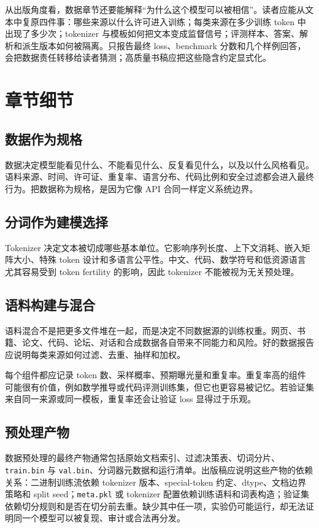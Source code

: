 \documentclass[UTF8,zihao=-4,openany]{ctexbook}
\begin{document}
从出版角度看，数据章节还要能解释“为什么这个模型可以被相信”。读者应能从文本中复原四件事：哪些来源以什么许可进入训练；每类来源在多少训练 token 中出现了多少次；tokenizer 与模板如何把文本变成监督信号；评测样本、答案、解析和派生版本如何被隔离。只报告最终 loss、benchmark 分数和几个样例回答，会把数据责任转移给读者猜测；高质量书稿应把这些隐含约定显式化。

\section{章节细节}
\subsection{数据作为规格}
数据决定模型能看见什么、不能看见什么、反复看见什么，以及以什么风格看见。语料来源、时间、许可证、重复率、语言分布、代码比例和安全过滤都会进入最终行为。把数据称为规格，是因为它像 API 合同一样定义系统边界。

\subsection{分词作为建模选择}
Tokenizer 决定文本被切成哪些基本单位。它影响序列长度、上下文消耗、嵌入矩阵大小、特殊 token 设计和多语言公平性。中文、代码、数学符号和低资源语言尤其容易受到 token fertility 的影响，因此 tokenizer 不能被视为无关预处理。

\subsection{语料构建与混合}
语料混合不是把更多文件堆在一起，而是决定不同数据源的训练权重。网页、书籍、论文、代码、论坛、对话和合成数据各自带来不同能力和风险。好的数据报告应说明每类来源如何过滤、去重、抽样和加权。

每个组件都应记录 token 数、采样概率、预期曝光量和重复率。重复率高的组件可能很有价值，例如数学推导或代码评测训练集，但它也更容易被记忆。若验证集来自同一来源或同一模板，重复率还会让验证 loss 显得过于乐观。

\subsection{预处理产物}
数据预处理的最终产物通常包括原始文档索引、过滤决策表、切词分片、\texttt{train.bin} 与 \texttt{val.bin}、分词器元数据和运行清单。出版稿应说明这些产物的依赖关系：二进制训练流依赖 tokenizer 版本、special-token 约定、dtype、文档边界策略和 split seed；\texttt{meta.pkl} 或 tokenizer 配置依赖训练语料和词表构造；验证集依赖切分规则和是否在切分前去重。缺少其中任一项，实验仍可能运行，却无法证明同一个模型可以被复现、审计或合法再分发。
\end{document}
